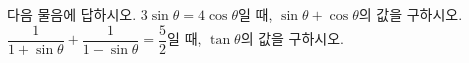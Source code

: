 다음 물음에 답하시오.
 $3\sin\theta=4\cos\theta$일 때, $\sin\theta+\cos\theta$의 값을 구하시오. 
 $\dfrac{1}{1+\sin\theta}+\dfrac{1}{1-\sin\theta}=\dfrac{5}{2}$일 때, $\tan\theta$의 값을 구하시오. 
